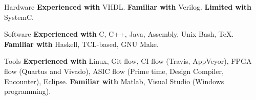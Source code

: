 
\begin{cvskills}

\cvskill
{Hardware}
{\textbf{Experienced with} VHDL. \textbf{Familiar with} Verilog. 
\textbf{Limited with} SystemC.}

\cvskill
{Software}
{\textbf{Experienced with} C, C++, Java, Assembly, Unix Bash, TeX. 
\textbf{Familiar with} Haskell, TCL-based, GNU Make.}

\cvskill
{Tools}
{\textbf{Experienced with} Linux, Git flow, CI flow (Travis, AppVeyor), FPGA 
flow (Quartus and Vivado), ASIC flow (Prime time, Design Compiler, Encounter), 
Eclipse. \textbf{Familiar with} Matlab, Visual Studio (Windows 
programming).}

\end{cvskills}